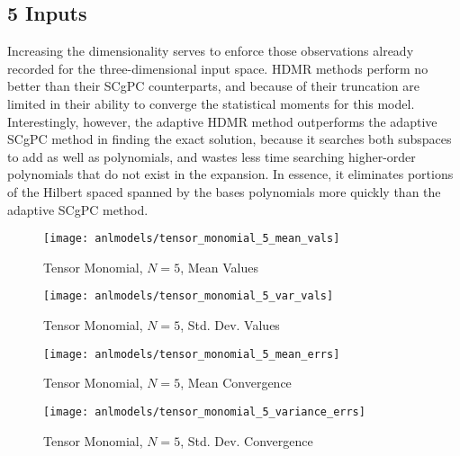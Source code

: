 \subsection{5 Inputs}
Increasing the dimensionality serves to enforce those observations already recorded for the three-dimensional
input space.  HDMR methods perform no better than their SCgPC counterparts, and because of their truncation
are limited in their ability to converge the statistical moments for this model.  Interestingly, however, the
adaptive HDMR method outperforms the adaptive SCgPC method in finding the exact solution, because it searches
both subspaces to add as well as polynomials, and wastes less time searching higher-order polynomials that do
not exist in the expansion.  In essence, it eliminates portions of the Hilbert spaced spanned by the
bases polynomials more quickly than the adaptive SCgPC method.
\begin{figure}[H]
  \centering
  \texttt{[image: anlmodels/tensor\_monomial\_5\_mean\_vals]}
  \caption{Tensor Monomial, $N=5$, Mean Values}
  \label{fig:hdmr tensormono mean values 5}
\end{figure}
\begin{figure}[H]
  \centering
  \texttt{[image: anlmodels/tensor\_monomial\_5\_var\_vals]}
  \caption{Tensor Monomial, $N=5$, Std. Dev. Values}
  \label{fig:hdmr tensormono var values 5}
\end{figure}

\begin{figure}[H]
  \centering
  \texttt{[image: anlmodels/tensor\_monomial\_5\_mean\_errs]}
  \caption{Tensor Monomial, $N=5$, Mean Convergence}
  \label{fig:hdmr tensormono mean errors 5}
\end{figure}
\begin{figure}[H]
  \centering
  \texttt{[image: anlmodels/tensor\_monomial\_5\_variance\_errs]}
  \caption{Tensor Monomial, $N=5$, Std. Dev. Convergence}
  \label{fig:hdmr tensormono var errors 5}
\end{figure}

